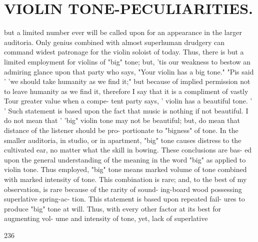 \documentclass{article}
\begin{document}
\section*{VIOLIN TONE-PECULIARITIES.}
but a limited number ever will be called upon for an appearance in the larger auditoria. Only genius combined with almost superhuman drudgery can command widest patronage for the violin soloist of today. Thus, there is but a limited employment for violins of "big" tone; but, 'tis our weakness to bestow an admiring glance upon that party who says, "Your violin has a big tone." "Pis said ' 'we should take humanity as we find it;" but because of implied permission not to leave humanity as we find it, therefore I say that it is a compliment of vastly Tour greater value when a compe- tent party says, ' violin has a beautiful tone. ' ' Such statement is based upon the fact that music is nothing if not beautiful. I do not mean that ' 'big" violin tone may not be beautiful; but, do mean that distance of the listener should be pro- portionate to "bigness" of tone. In the smaller auditoria, in studio, or in apartment, "big" tone causes distress to the cultivated ear, no matter what the skill in bowing. These conclusions are bas- ed upon the general understanding of the meaning in the word "big" as applied to violin tone. Thus employed, "big" tone means marked volume of tone combined with marked intensity of tone. This combination is rare; and, to the best of my observation, is rare because of the rarity of sound- ing-board wood possessing superlative spring-ac- tion. This statement is based upon repeated fail- ures to produce "big" tone at will. Thus, with every other factor at its best for augmenting vol- ume and intensity of tone, yet, lack of superlative

236
\end{document}
